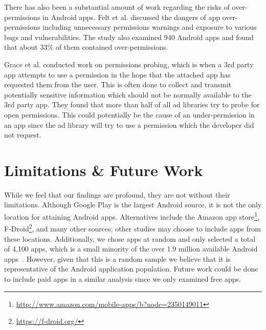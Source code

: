 \documentclass{sig-alternate-05-2015}
\begin{document}



There has also been a substantial amount of work regarding the risks of over-permissions in Android apps. Felt et al.\cite{Felt:2011:APD:2046707.2046779} discussed the dangers of app over-permissions including unnecessary permissions warnings and exposure to various bugs and vulnerabilities. The study also examined 940 Android apps and found that about 33\% of them contained over-permissions.


Grace et al.\cite{Grace:2012:UEA:2185448.2185464} conducted work on permissions probing, which is when a 3rd party app attempts to use a permission in the hope that the attached app has requested them from the user. This is often done to collect and transmit potentially sensitive information which should not be normally available to the 3rd party app. They found that more than half of all ad libraries try to probe for open permissions. This could potentially be the cause of an under-permission in an app since the ad library will try to use a permission which the developer did not request.





\section{Limitations \& Future Work}
\label{sec:limitations}






While we feel that our findings are profound, they are not without their limitations. Although Google Play is the largest Android source, it is not the only location for attaining Android apps. Alternatives include the Amazon app store\footnote{\url{http://www.amazon.com/mobile-apps/b?node=2350149011}}, F-Droid\footnote{\url{https://f-droid.org/}}, and many other sources; other studies may choose to include apps from these locations. Additionally, we chose apps at random and only selected a total of 4,100 apps, which is a small minority of the over 1.9 million available Android apps~\cite{appbrain_stats_url}. However, given that this is a random sample we believe that it is representative of the Android application population. Future work could be done to include paid apps in a similar analysis since we only examined free apps.
\end{document}
